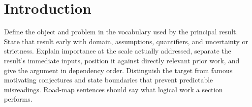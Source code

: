 \section{Introduction}

Define the object and problem in the vocabulary used by the principal result.
State that result early with domain, assumptions, quantifiers, and uncertainty
or strictness. Explain importance at the scale actually addressed, separate the
result's immediate inputs, position it against directly relevant prior work,
and give the argument in dependency order. Distinguish the target from famous
motivating conjectures and state boundaries that prevent predictable
misreadings. Road-map sentences should say what logical work a section performs.
